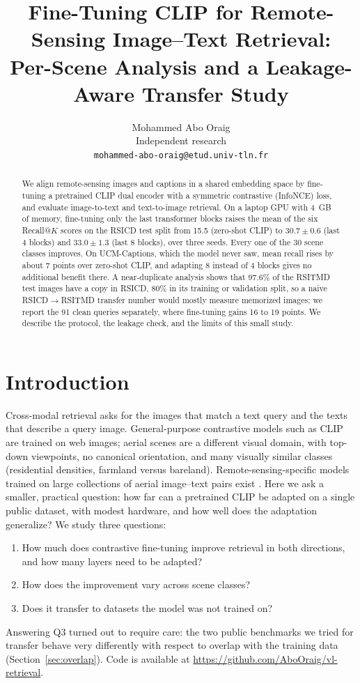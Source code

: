 \documentclass[11pt,a4paper]{article}
\title{\LARGE\textbf{Fine-Tuning CLIP for Remote-Sensing Image--Text Retrieval:}\\[4pt]
\large\textbf{Per-Scene Analysis and a Leakage-Aware Transfer Study}}
\author{Mohammed Abo Oraig \\ \small Independent research \\ \small \texttt{mohammed-abo-oraig@etud.univ-tln.fr}}
\date{}
\begin{document}
\maketitle

\begin{abstract}
We align remote-sensing images and captions in a shared embedding space by fine-tuning a pretrained CLIP dual encoder with a symmetric contrastive (InfoNCE) loss, and evaluate image-to-text and text-to-image retrieval. On a laptop GPU with 4~GB of memory, fine-tuning only the last transformer blocks raises the mean of the six Recall@$K$ scores on the RSICD test split from 15.5 (zero-shot CLIP) to $30.7\pm0.6$ (last 4 blocks) and $33.0\pm1.3$ (last 8 blocks), over three seeds. Every one of the 30 scene classes improves. On UCM-Captions, which the model never saw, mean recall rises by about 7 points over zero-shot CLIP, and adapting 8 instead of 4 blocks gives no additional benefit there. A near-duplicate analysis shows that 97.6\% of the RSITMD test images have a copy in RSICD, 80\% in its training or validation split, so a naive RSICD$\to$RSITMD transfer number would mostly measure memorized images; we report the 91 clean queries separately, where fine-tuning gains 16 to 19 points. We describe the protocol, the leakage check, and the limits of this small study.
\end{abstract}

\section{Introduction}
Cross-modal retrieval asks for the images that match a text query and the texts that describe a query image. General-purpose contrastive models such as CLIP \citep{radford2021clip} are trained on web images; aerial scenes are a different visual domain, with top-down viewpoints, no canonical orientation, and many visually similar classes (residential densities, farmland versus bareland). Remote-sensing-specific models trained on large collections of aerial image--text pairs exist \citep{liu2024remoteclip}. Here we ask a smaller, practical question: how far can a pretrained CLIP be adapted on a single public dataset, with modest hardware, and how well does the adaptation generalize? We study three questions:
\begin{enumerate}
  \item[\textbf{Q1}] How much does contrastive fine-tuning improve retrieval in both directions, and how many layers need to be adapted?
  \item[\textbf{Q2}] How does the improvement vary across scene classes?
  \item[\textbf{Q3}] Does it transfer to datasets the model was not trained on?
\end{enumerate}
Answering Q3 turned out to require care: the two public benchmarks we tried for transfer behave very differently with respect to overlap with the training data (Section~\ref{sec:overlap}). Code is available at \url{https://github.com/AboOraig/vl-retrieval}.
\end{document}
